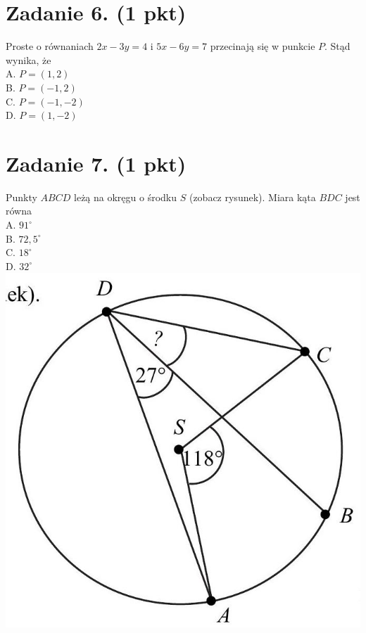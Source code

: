 \documentclass[10pt]{article}
\begin{document}
\section*{Zadanie 6. (1 pkt)}
Proste o równaniach \(2 x-3 y=4\) i \(5 x-6 y=7\) przecinają się w punkcie \(P\). Stąd wynika, że\\
A. \(P=(1,2)\)\\
B. \(P=(-1,2)\)\\
C. \(P=(-1,-2)\)\\
D. \(P=(1,-2)\)

\section*{Zadanie 7. (1 pkt)}
Punkty \(A B C D\) leżą na okręgu o środku \(S\) (zobacz rysunek). Miara kąta \(B D C\) jest równa\\
A. \(91^{\circ}\)\\
B. \(72,5^{\circ}\)\\
C. \(18^{\circ}\)\\
D. \(32^{\circ}\)\\
\includegraphics[max width=\textwidth, center]{2024_11_21_779b7f825da3a12753feg-02}
\end{document}
